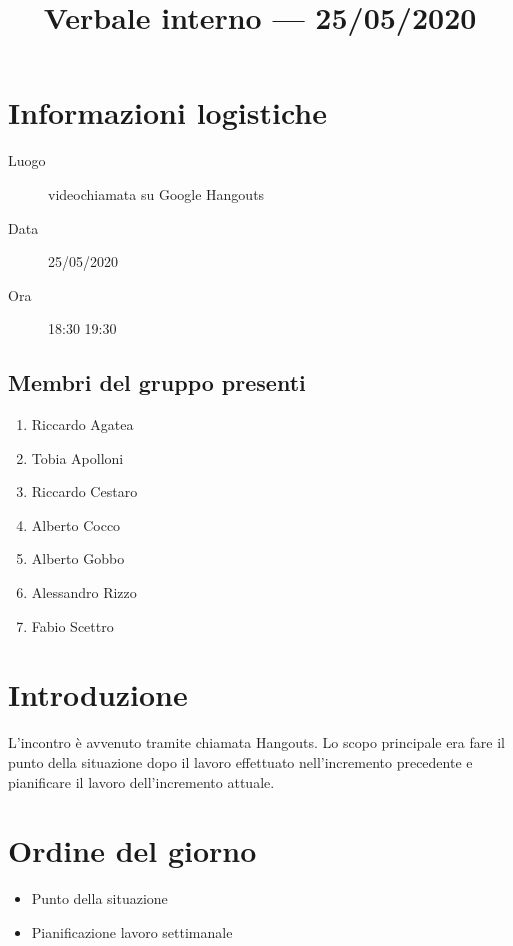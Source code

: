 \documentclass{article}
\title{Verbale interno --- 25/05/2020}
\begin{document}


\section{Informazioni logistiche}%
\label{sec:informazioni_logistiche}

\begin{description}
  \item [Luogo] videochiamata su Google Hangouts
  \item [Data] 25/05/2020
  \item [Ora] 18:30  19:30
\end{description}

\subsection{Membri del gruppo presenti}%
\label{sub:membri_del_gruppo_presenti}

\begin{enumerate}
  \item Riccardo Agatea
  \item Tobia Apolloni
  \item Riccardo Cestaro
  \item Alberto Cocco
  \item Alberto Gobbo
  \item Alessandro Rizzo
  \item Fabio Scettro
\end{enumerate}

\section{Introduzione}%
\label{sec:introduzione}
L'incontro è avvenuto tramite chiamata Hangouts.
Lo scopo principale era fare il punto della situazione dopo il lavoro effettuato nell'incremento precedente e pianificare il lavoro dell'incremento attuale.

\section{Ordine del giorno}%
\label{sec:ordine_del_giorno}

\begin{itemize}
  \item Punto della situazione
  \item Pianificazione lavoro settimanale
\end{itemize}
\end{document}
